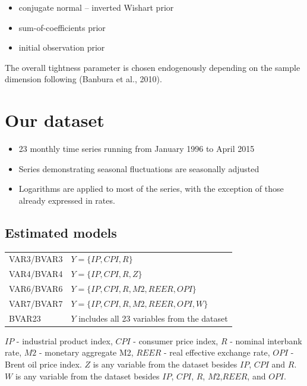 \documentclass[a0, landscape]{a0poster}
\newcommand{\cIW}{\mathcal{IW}}
\newcommand{\prior}{\underline}
\newcommand{\cN}{\mathcal{N}}
\begin{document}
\begin{multicols}{3}
\begin{itemize}
\item  conjugate normal -- inverted Wishart prior
%
%
%
%
\item sum-of-coefficients prior
\item initial observation prior
\end{itemize}
The overall tightness parameter is chosen endogenously depending on the sample dimension following (Banbura et al., 2010).

\section*{Our dataset}
\begin{itemize}
\item 23 monthly time series running from January 1996 to April 2015
\item Series demonstrating seasonal fluctuations are seasonally adjusted
\item Logarithms are applied to most of the series, with the exception of those already expressed in rates.
\end{itemize}


\subsection*{Estimated models}

\begin{center}
\begin{tabular}{ll}
\toprule
VAR3/BVAR3 & $Y=\lbrace IP, CPI, R \rbrace$\\
VAR4/BVAR4 & $Y=\lbrace IP, CPI, R, Z\rbrace$ \\
VAR6/BVAR6 & $Y=\lbrace IP, CPI, R, M2, REER, OPI \rbrace$ \\
VAR7/BVAR7 & $Y=\lbrace IP, CPI, R, M2, REER, OPI, W \rbrace$\\
BVAR23     & $Y$ includes all 23 variables from the dataset\\
\bottomrule
\end{tabular}
\end{center}
$IP$ - industrial product index, $CPI$ - consumer price index, $R$ - nominal interbank rate, $M2$ - monetary aggregate M2, $REER$ - real effective exchange rate, $OPI$ - Brent oil price index. $Z$ is any variable from the dataset besides $IP$, $CPI$ and $R$.  $W$ is any variable from the dataset besides $IP$, $CPI$, $R$, $M2$,$REER$, and $OPI$.


\end{multicols}
\end{document}
